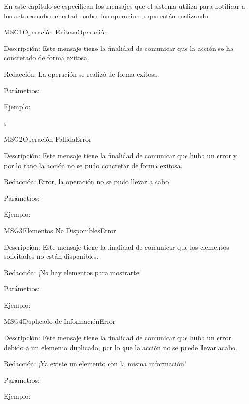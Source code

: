 En este capítulo se especifican los mensajes que el sistema utiliza para notificar a los actores sobre el estado sobre las operaciones que están realizando.


\begin{mensaje}{MSG1}{Operación Exitosa}{Operación}
	\item[Descripción:]Este mensaje tiene la finalidad de comunicar que la acción se ha concretado de forma exitosa.
	\item[Redacción:]La operación se realizó de forma exitosa.
	\item[Parámetros:] 
	\begin{Citemize}
 			\item 
		\end{Citemize}
	\item[Ejemplo:] 
\end{mensaje}s

\begin{mensaje}{MSG2}{Operación Fallida}{Error}
	\item[Descripción:]Este mensaje tiene la finalidad de comunicar que hubo un error y por lo tano la acción no se pudo concretar de forma exitosa.
	\item[Redacción:]Error, la operación no se pudo llevar a cabo.
	\item[Parámetros:] 
	\begin{Citemize}
 			\item 
		\end{Citemize}
	\item[Ejemplo:] 
\end{mensaje}

\begin{mensaje}{MSG3}{Elementos No Disponibles}{Error}
	\item[Descripción:]Este mensaje tiene la finalidad de comunicar que los elementos solicitados no están disponibles.
	\item[Redacción:]¡No hay elementos para mostrarte!
	\item[Parámetros:] 
	\begin{Citemize}
 			\item 
		\end{Citemize}
	\item[Ejemplo:] 
\end{mensaje}

\begin{mensaje}{MSG4}{Duplicado de Información}{Error}
	\item[Descripción:]Este mensaje tiene la finalidad de comunicar que hubo un error debido a un elemento duplicado, por lo que la acción no se puede llevar acabo.
	\item[Redacción:]¡Ya existe un elemento con la misma información!
	\item[Parámetros:] 
	\begin{Citemize}
 			\item 
		\end{Citemize}
	\item[Ejemplo:] 
\end{mensaje}


